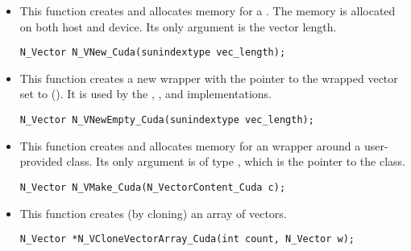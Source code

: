 \begin{itemize}

  

\item {}
 
  This function creates and allocates memory for a {\cuda} .
  The memory is allocated on both host and device. Its only argument is the 
  vector length. 

\begin{verbatim}
N_Vector N_VNew_Cuda(sunindextype vec_length);
\end{verbatim}

  

\item {}
 
  This function creates a new {\nvector} wrapper with the pointer to
  the wrapped {\cuda} vector set to (). It is used by the 
  , , and  
  implementations. 

\begin{verbatim}
N_Vector N_VNewEmpty_Cuda(sunindextype vec_length);
\end{verbatim}

  

\item {}
  
  This function creates and allocates memory for an {\nveccuda}
  wrapper around a user-provided  class. 
  Its only argument is of type , which
  is the pointer to the class.

\begin{verbatim}
N_Vector N_VMake_Cuda(N_VectorContent_Cuda c);
\end{verbatim}



\item {}
 
  This function creates (by cloning) an array of  {\nveccuda} vectors.
 
\begin{verbatim}
N_Vector *N_VCloneVectorArray_Cuda(int count, N_Vector w);
\end{verbatim}



\end{itemize}
